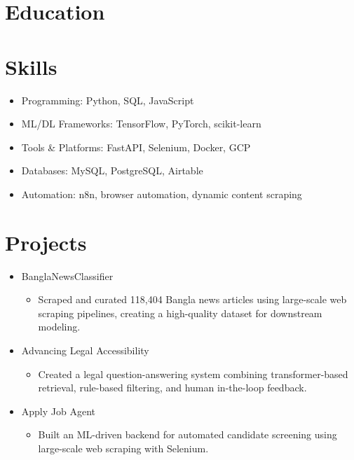 \documentclass[11pt,a4paper,sans]{moderncv}
\begin{document}
\section{Education}

\section{Skills}
\begin{itemize}
    \item Programming: Python, SQL, JavaScript
    \item ML/DL Frameworks: TensorFlow, PyTorch, scikit-learn
    \item Tools \& Platforms: FastAPI, Selenium, Docker, GCP
    \item Databases: MySQL, PostgreSQL, Airtable
    \item Automation: n8n, browser automation, dynamic content scraping
\end{itemize}

\section{Projects}
\begin{itemize}
    \item BanglaNewsClassifier
    \begin{itemize}
        \item Scraped and curated 118,404 Bangla news articles using large-scale web scraping pipelines, creating a high-quality dataset for downstream modeling.
    \end{itemize}
    \item Advancing Legal Accessibility
    \begin{itemize}
        \item Created a legal question-answering system combining transformer-based retrieval, rule-based filtering, and human in-the-loop feedback.
    \end{itemize}
    \item Apply Job Agent
    \begin{itemize}
        \item Built an ML-driven backend for automated candidate screening using large-scale web scraping with Selenium.
    \end{itemize}
\end{itemize}
\end{document}
